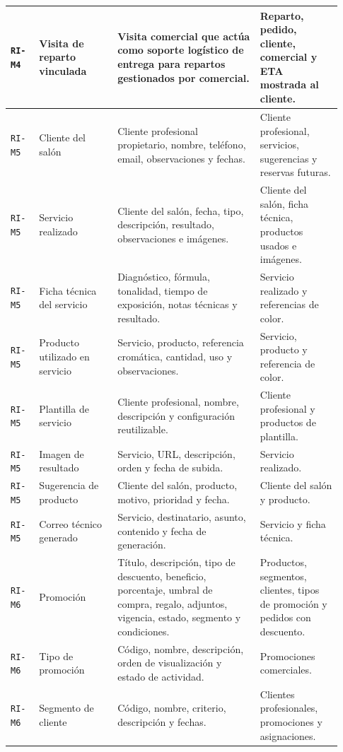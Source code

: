 {\begin{supertabular}{|>{\raggedright\arraybackslash}p{0.08\linewidth}|>{\raggedright\arraybackslash}p{0.22\linewidth}|>{\raggedright\arraybackslash}p{0.40\linewidth}|>{\raggedright\arraybackslash}p{0.23\linewidth}|}
\hline
\texttt{RI-M4} & Visita de reparto vinculada & Visita comercial que actúa como soporte logístico de entrega para repartos gestionados por comercial. & Reparto, pedido, cliente, comercial y ETA mostrada al cliente. \\
\hline
{}
\texttt{RI-M5} & Cliente del salón & Cliente profesional propietario, nombre, teléfono, email, observaciones y fechas. & Cliente profesional, servicios, sugerencias y reservas futuras. \\
\hline
\texttt{RI-M5} & Servicio realizado & Cliente del salón, fecha, tipo, descripción, resultado, observaciones e imágenes. & Cliente del salón, ficha técnica, productos usados e imágenes. \\
\hline
\texttt{RI-M5} & Ficha técnica del servicio & Diagnóstico, fórmula, tonalidad, tiempo de exposición, notas técnicas y resultado. & Servicio realizado y referencias de color. \\
\hline
\texttt{RI-M5} & Producto utilizado en servicio & Servicio, producto, referencia cromática, cantidad, uso y observaciones. & Servicio, producto y referencia de color. \\
\hline
\texttt{RI-M5} & Plantilla de servicio & Cliente profesional, nombre, descripción y configuración reutilizable. & Cliente profesional y productos de plantilla. \\
\hline
\texttt{RI-M5} & Imagen de resultado & Servicio, URL, descripción, orden y fecha de subida. & Servicio realizado. \\
\hline
\texttt{RI-M5} & Sugerencia de producto & Cliente del salón, producto, motivo, prioridad y fecha. & Cliente del salón y producto. \\
\hline
\texttt{RI-M5} & Correo técnico generado & Servicio, destinatario, asunto, contenido y fecha de generación. & Servicio y ficha técnica. \\
\hline
{}
\texttt{RI-M6} & Promoción & Título, descripción, tipo de descuento, beneficio, porcentaje, umbral de compra, regalo, adjuntos, vigencia, estado, segmento y condiciones. & Productos, segmentos, clientes, tipos de promoción y pedidos con descuento. \\
\hline
\texttt{RI-M6} & Tipo de promoción & Código, nombre, descripción, orden de visualización y estado de actividad. & Promociones comerciales. \\
\hline
\texttt{RI-M6} & Segmento de cliente & Código, nombre, criterio, descripción y fechas. & Clientes profesionales, promociones y asignaciones. \\

\end{supertabular}}

